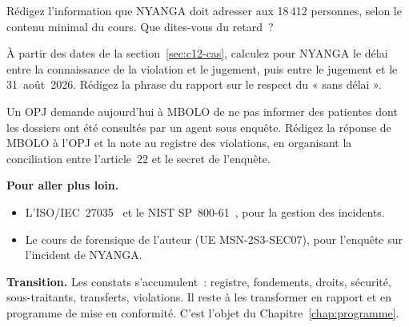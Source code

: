 \begin{boxexo}[title={\ding{45}\quad Exercice~12.2. Informer M. TAGNE \niveaumoyen}]
Rédigez l'information que NYANGA doit adresser aux 18\,412 personnes,
selon le contenu minimal du cours. Que dites-vous du retard~?
\end{boxexo}

\begin{boxexo}[title={\ding{45}\quad Exercice~12.3. La chronologie \niveaumoyen}]
À partir des dates de la section~\ref{sec:c12-cas}, calculez pour NYANGA le
délai entre la connaissance de la violation et le jugement, puis entre le
jugement et le 31~août~2026. Rédigez la phrase du rapport sur le respect du
« sans délai ».
\end{boxexo}

\begin{boxexo}[title={\ding{45}\quad Exercice~12.4. La demande de l'OPJ \niveauexpert}]
Un OPJ demande aujourd'hui à MBOLO de ne pas informer des patientes dont les
dossiers ont été consultés par un agent sous enquête. Rédigez la réponse de
MBOLO à l'OPJ et la note au registre des violations, en organisant la
conciliation entre l'article~22 et le secret de l'enquête.
\end{boxexo}

\bigskip

\begin{boxinfo}
\textbf{Pour aller plus loin.}
\begin{itemize}
    \item L'ISO/IEC~27035~\cite{iso27035} et le NIST SP~800-61~\cite{nist80061r2},
          pour la gestion des incidents.
    \item Le cours de forensique de l'auteur (UE MSN-2S3-SEC07), pour
          l'enquête sur l'incident de NYANGA.
\end{itemize}
\end{boxinfo}

\begin{boxinfo}
\textbf{Transition.} Les constats s'accumulent~: registre, fondements,
droits, sécurité, sous-traitants, transferts, violations. Il reste à les
transformer en rapport et en programme de mise en conformité. C'est
l'objet du Chapitre~\ref{chap:programme}.
\end{boxinfo}
